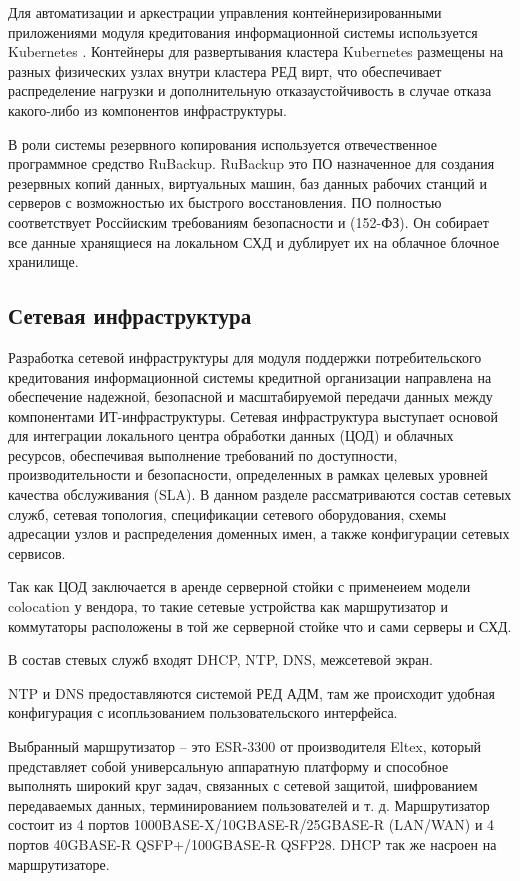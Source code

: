 \documentclass[14pt, a4paper]{extarticle}
\begin{document}
Для автоматизации и аркестрации управления контейнеризированными приложениями модуля кредитования
информационной системы используется Kubernetes \cite{k8s}. Контейнеры для развертывания кластера Kubernetes
размещены на разных физических узлах внутри кластера РЕД вирт, что обеспечивает распределение нагрузки
и дополнительную отказаустойчивость в случае отказа какого-либо из компонентов инфраструктуры.

В роли системы резервного копирования используется отвечественное программное средство RuBackup.
RuBackup это ПО назначенное для создания резервных копий данных, виртуальных машин, баз данных
рабочих станций и серверов с возможностью их быстрого восстановления. ПО полностью соответствует
Россйиским требованиям безопасности и (152-ФЗ). Он собирает все данные хранящиеся на локальном СХД
и дублирует их на облачное блочное хранилище.

\subsection{Сетевая инфраструктура}

Разработка сетевой инфраструктуры для модуля поддержки потребительского кредитования информационной
системы кредитной организации направлена на обеспечение надежной, безопасной и масштабируемой
передачи данных между компонентами ИТ-инфраструктуры. Сетевая инфраструктура выступает основой
для интеграции локального центра обработки данных (ЦОД) и облачных ресурсов, обеспечивая выполнение
требований по доступности, производительности и безопасности, определенных в рамках целевых уровней
качества обслуживания (SLA). В данном разделе рассматриваются состав сетевых служб, сетевая топология,
спецификации сетевого оборудования, схемы адресации узлов и распределения доменных имен, а также
конфигурации сетевых сервисов.

Так как ЦОД заключается в аренде серверной стойки с применеием модели colocation у
вендора, то такие сетевые устройства как маршрутизатор и коммутаторы расположены в той же
серверной стойке что и сами серверы и СХД.

В состав стевых служб входят DHCP, NTP, DNS, межсетевой экран.

NTP и DNS предоставляются системой РЕД АДМ, там же происходит удобная конфигурация
с исопльзованием пользовательского интерфейса.

Выбранный маршрутизатор -- это ESR-3300 от производителя Eltex, который представляет собой
универсальную аппаратную платформу и способное выполнять широкий круг задач,
связанных с сетевой защитой, шифрованием передаваемых данных,
терминированием пользователей и т. д. Маршрутизатор состоит из 4 портов 1000BASE-X/10GBASE-R/25GBASE-R (LAN/WAN) и
4 портов 40GBASE-R QSFP+/100GBASE-R QSFP28. DHCP так же насроен на маршрутизаторе.
\end{document}
